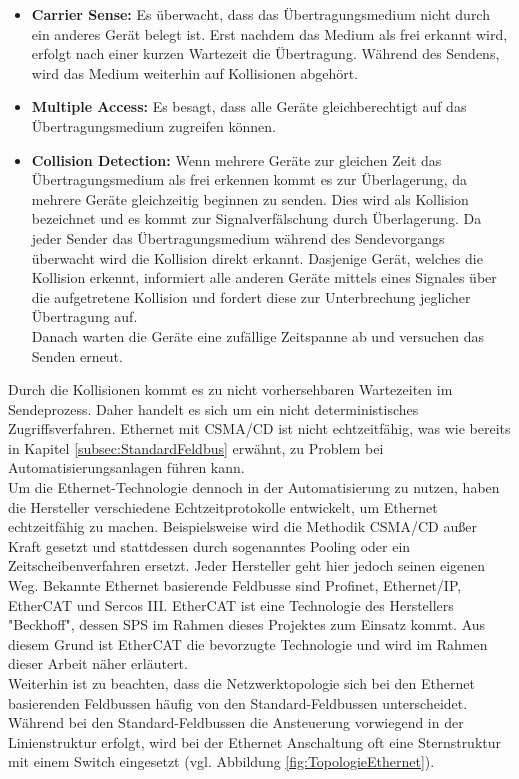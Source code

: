 \documentclass[ a4paper,
                oneside,
                toc=bibliography,
                toc=listof
                ]{scrbook}
\begin{document}
	\begin{itemize}
		\item \textbf{Carrier Sense:} Es überwacht, dass das Übertragungsmedium nicht durch ein anderes Gerät belegt ist. Erst nachdem das Medium als frei erkannt wird, erfolgt nach einer kurzen Wartezeit die Übertragung. Während des Sendens, wird das Medium weiterhin auf Kollisionen abgehört.
		\item \textbf{Multiple Access:} Es besagt, dass alle Geräte gleichberechtigt auf das Übertragungsmedium zugreifen können.
		\item \textbf{Collision Detection:} Wenn mehrere Geräte zur gleichen Zeit das Übertragungsmedium als frei erkennen kommt es zur Überlagerung, da mehrere Geräte gleichzeitig beginnen zu senden. Dies wird als Kollision bezeichnet und es kommt zur Signalverfälschung durch Überlagerung. Da jeder Sender das Übertragungsmedium während des Sendevorgangs überwacht wird die Kollision direkt erkannt. Dasjenige Gerät, welches die Kollision erkennt, informiert alle anderen Geräte mittels eines Signales über die aufgetretene Kollision und fordert diese zur Unterbrechung jeglicher Übertragung auf. \\
		Danach warten die Geräte eine zufällige Zeitspanne ab und versuchen das Senden erneut. \cite{riggert2002rechnernetze}
	\end{itemize}
	Durch die Kollisionen kommt es zu nicht vorhersehbaren Wartezeiten im Sendeprozess. Daher handelt es sich um ein nicht deterministisches Zugriffsverfahren. Ethernet mit CSMA/CD ist nicht echtzeitfähig, was wie bereits in Kapitel \ref{subsec:StandardFeldbus} erwähnt, zu Problem bei Automatisierungsanlagen führen kann.\\
	Um die Ethernet-Technologie dennoch in der Automatisierung zu nutzen, haben die Hersteller verschiedene Echtzeitprotokolle entwickelt, um Ethernet echtzeitfähig zu machen. Beispielsweise wird die Methodik CSMA/CD außer Kraft gesetzt und stattdessen durch sogenanntes Pooling oder ein Zeitscheibenverfahren ersetzt. Jeder Hersteller geht hier jedoch seinen eigenen Weg.	Bekannte Ethernet basierende Feldbusse sind Profinet, Ethernet/IP, EtherCAT und Sercos III.
	EtherCAT ist eine Technologie des Herstellers "Beckhoff", dessen SPS im Rahmen dieses Projektes zum Einsatz kommt. Aus diesem Grund ist EtherCAT die bevorzugte Technologie und wird im Rahmen dieser Arbeit näher erläutert. \cite{ethercat} \cite{riggert2002rechnernetze}\
	\\
	Weiterhin ist zu beachten, dass die Netzwerktopologie sich bei den Ethernet basierenden Feldbussen häufig von den Standard-Feldbussen unterscheidet. Während bei den Standard-Feldbussen die Ansteuerung vorwiegend in der Linienstruktur erfolgt, wird bei der Ethernet Anschaltung oft eine Sternstruktur mit einem Switch eingesetzt (vgl. Abbildung \ref{fig:TopologieEthernet}).
\end{document}
